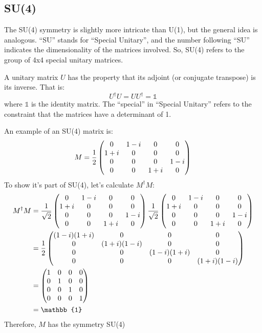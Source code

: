 \subsection{SU(4)}
The SU(4) symmetry is slightly more intricate than U(1), but the general idea is analogous. ``SU'' stands for ``Special Unitary'', and the number following ``SU'' indicates the dimensionality of the matrices involved. So, SU(4) refers to the group of 4x4 special unitary matrices.

A unitary matrix \(U\) has the property that its adjoint (or conjugate transpose) is its inverse. That is:
\[U^{\dag}U=UU^{\dag}=\mathbb{1}\]
where \(\mathbb{1}\) is the identity matrix. The ``special'' in ``Special Unitary'' refers to the constraint that the matrices have a determinant of 1.

\begin{example}
  An example of an SU(4) matrix is:
  \[
    M=\frac{1}{2}
    \begin{pmatrix}
      0 & 1-i & 0 & 0 \\
      1+i & 0 & 0 & 0 \\
      0 & 0 & 0 & 1-i \\
      0 & 0 & 1+i & 0
    \end{pmatrix}
  \]
  To show it's part of SU(4), let's calculate \(M^{\dag}M\):
  \begin{align*}
    M^{\dag} M
     & = \nsqrt{2}
    \begin{pmatrix}
      \fourrow{0}{1-i}{0}{0} \\
      \fourrow{1+i}{0}{0}{0} \\
      \fourrow{0}{0}{0}{1-i} \\
      \fourrow{0}{0}{1+i}{0}
    \end{pmatrix}
    \nsqrt{2}
    \begin{pmatrix}
      \fourrow{0}{1-i}{0}{0} \\
      \fourrow{1+i}{0}{0}{0} \\
      \fourrow{0}{0}{0}{1-i} \\
      \fourrow{0}{0}{1+i}{0}
    \end{pmatrix}        \\
     & = \frac{1}{2}
    \begin{pmatrix}
      \fourrow{(1-i)(1+i)}{0}{0}{0} \\
      \fourrow{0}{(1+i)(1-i)}{0}{0} \\
      \fourrow{0}{0}{(1-i)(1+i)}{0} \\
      \fourrow{0}{0}{0}{(1+i)(1-i)}
    \end{pmatrix} \\
     & =
    \begin{pmatrix}
      \fourrow{1}{0}{0}{0} \\
      \fourrow{0}{1}{0}{0} \\
      \fourrow{0}{0}{1}{0} \\
      \fourrow{0}{0}{0}{1}
    \end{pmatrix}          \\
     & = \mathbb{1}
  \end{align*}
  Therefore, \(M\) has the symmetry SU(4)
\end{example}

